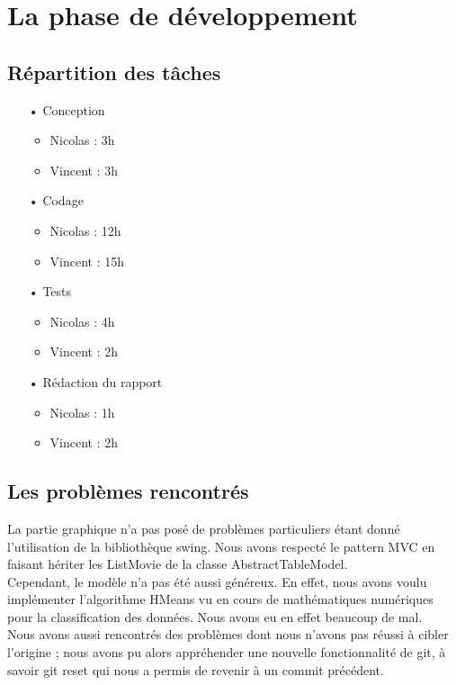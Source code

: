 \section{La phase de développement}

\subsection{Répartition des tâches}

\begin{itemize}
\item[•]{Conception}

	\begin{itemize}
		\item{Nicolas : 3h}
		\item{Vincent : 3h}
	\end{itemize}

\item[•]{Codage}

	\begin{itemize}
		\item{Nicolas : 12h}
		\item{Vincent : 15h}
	\end{itemize}

\item[•]{Tests}

	\begin{itemize}
		\item{Nicolas : 4h}
		\item{Vincent : 2h}
	\end{itemize}

\item[•]{Rédaction du rapport}
	\begin{itemize}
		\item{Nicolas : 1h}
		\item{Vincent : 2h}
	\end{itemize}
\end{itemize}

\subsection{Les problèmes rencontrés}

La partie graphique n'a pas posé de problèmes particuliers étant donné l'utilisation de la bibliothèque swing. Nous avons respecté le pattern MVC en faisant hériter les ListMovie de la classe AbstractTableModel. \\
Cependant, le modèle n'a pas été aussi généreux. En effet, nous avons voulu implémenter l'algorithme HMeans vu en cours de mathématiques numériques pour la classification des données. Nous avons eu en effet beaucoup de mal. \\
Nous avons aussi rencontrés des problèmes dont nous n'avons pas réussi à cibler l'origine ; nous avons pu alors appréhender une nouvelle fonctionnalité de git, à savoir git reset qui nous a permis de revenir à un commit précédent.